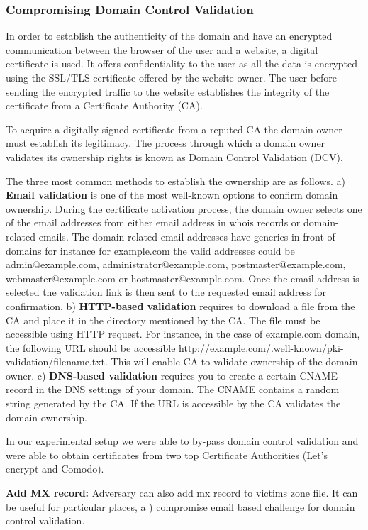 \subsubsection{Compromising Domain Control Validation}


In order to establish the authenticity of the domain and have an encrypted communication between the browser of the user and a website, a digital certificate is used. It offers confidentiality to the user as all the data is encrypted using the SSL/TLS certificate offered by the website owner. The user before sending the encrypted traffic to the website establishes the integrity of the certificate from a  Certificate Authority (CA). 

To acquire a digitally signed certificate from a reputed CA  the domain owner must establish its legitimacy. The process through which a  domain owner validates its ownership rights is known as Domain Control Validation (DCV). 

The three most common methods to establish the ownership are as follows. 
a) \textbf {Email validation} is one of the most well-known options to confirm domain ownership. During the certificate activation process, the domain owner selects one of the email addresses from either email address in whois records or domain-related emails. The domain related email addresses have generics in front of domains for instance for example.com  the valid addresses could be admin@example.com, administrator@example.com, postmaster@example.com, webmaster@example.com or hostmaster@example.com. Once the email address is selected the validation link is then sent to the requested email address for confirmation. b) \textbf{HTTP-based validation} requires to download a file from the CA and place it in the directory mentioned by the CA. The file must be accessible using HTTP request. For instance, in the case of example.com domain, the following URL should be accessible http://example.com/.well-known/pki-validation/filename.txt. This will enable CA to validate ownership of the domain owner. c) \textbf{DNS-based validation} requires you to create a certain CNAME record in the DNS settings of your domain. The CNAME contains a random string generated by the CA. If the URL is accessible by the CA validates the domain ownership. 


In our experimental setup we were able to by-pass domain control validation and were able to obtain certificates from two top Certificate Authorities (Let's encrypt and Comodo). %

\textbf{ Add MX record:} 
Adversary can also add mx record to victims zone file. It can be useful for particular places, a ) compromise email based challenge for domain control validation. %


